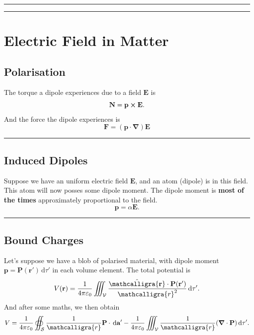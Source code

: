 \documentclass[12pt,english]{article}
\newcommand{\dmr}[1]{\, \mathrm{d}#1} %
\numberwithin{equation}{subsection}
\newcommand{\curly}[1]{\ensuremath{\mathcalligra{#1}}}
\let\oldhat\hat
\renewcommand{\vec}[1]{\mathbf{#1}}
\renewcommand{\hat}[1]{\oldhat{\mathbf{#1}}}
\begin{document}
\par\noindent\rule{\textwidth}{0.4pt}
\par\noindent\rule{\textwidth}{0.4pt}
\section{Electric Field in Matter}

\subsection{Polarisation}
The torque a dipole experiences due to a field $\vec{E}$ is 
\begin{equation}
    \vec{N} = \vec{p} \cross \vec{E}.
\end{equation}
And the force the dipole experiences is 
\begin{equation}
    \vec{F} = (\vec{p}\cdot\vec{\nabla})\vec{E}
\end{equation}
\par\noindent\rule{\textwidth}{0.4pt}

\subsection{Induced Dipoles}
Suppose we have an uniform electric field $\vec{E}$, and an atom (dipole) is in this field. This atom will now posses some dipole moment. The dipole moment is \textbf{most of the times} approximately proportional to the field.
\begin{equation}
    \vec{p} = \alpha \vec{E}.
\end{equation}
\par\noindent\rule{\textwidth}{0.4pt}
\subsection{Bound Charges}
Let's suppose we have a blob of polarised material, with dipole moment $\vec{p} = \vec{P}(\vec{r'})\dmr{\tau'}$ in each volume element. The total potential is 
\[
    V(\vec{r})= \frac{1}{4 \pi \varepsilon_0}\iiint_{\mathcal{V}}\frac{\hat{\curly{r}}\cdot \vec{P}(\vec{r'})}{\curly{r}^2}\dmr{\tau'}.
\]
And after some maths, we then obtain
\begin{equation}
    V = \frac{1}{4 \pi \varepsilon_0} \oiint_{\mathcal{S}} \frac{1}{\curly{r}} \vec{P}\cdot \dmr{\vec{a'}} - \frac{1}{4 \pi \varepsilon_0} \iiint_{\mathcal{V}} \frac{1}{\curly{r}} (\grad \cdot \vec{P}) \dmr{\tau'}.    
\end{equation}
\end{document}
